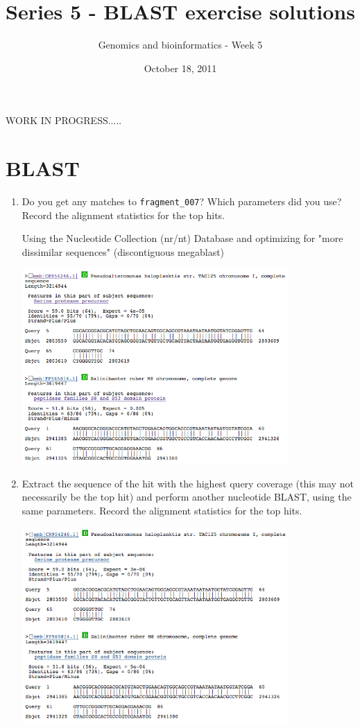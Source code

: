 \documentclass[a4paper,11pt]{article}
\title{Series 5 - BLAST exercise solutions}
\date{October 18, 2011}
\author{Genomics and bioinformatics - Week 5}
\begin{document}
\maketitle

WORK IN PROGRESS..... 

\section{BLAST}

\begin{enumerate}
\item Do you get any matches to \texttt{fragment\_007}? Which parameters did you use? Record the alignment statistics for the top hits.

Using the Nucleotide Collection (nr/nt) Database and optimizing for "more dissimilar sequences"
(discontiguous megablast)

\vspace{0.5cm}
\begin{center}
\includegraphics[width=0.8\textwidth]{blastn1.png}
\end{center}
\vspace{0.5cm}

\item Extract the sequence of the hit with the highest query coverage (this may not necessarily be the top hit) and perform another nucleotide BLAST, using the same parameters. Record the alignment statistics for the top hits.

\vspace{0.5cm}
\begin{center}
\includegraphics[width=0.8\textwidth]{blastn2.png}
\end{center}
\vspace{0.5cm}


\end{enumerate}
\end{document}
